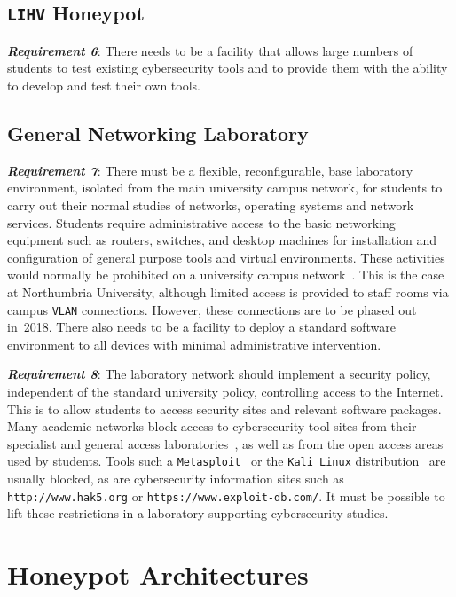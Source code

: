 \documentclass{ieeeaccess}
\begin{document}
\subsection{\texttt{LIHV} Honeypot}\label{subsec:LabHoneypot}

\noindent\textit{\textbf{Requirement 6}}:
There needs to be a facility that allows large numbers of students to test
existing cybersecurity tools and to provide them with the ability to develop
and test their own tools.

\subsection{General Networking Laboratory}\label{subsec:GeneralLab}

\noindent\textit{\textbf{Requirement 7}}: There must be a flexible,
reconfigurable, base laboratory environment, isolated from the main university
campus network, for students to carry out their normal studies of networks,
operating systems and network services. Students require administrative access
to the basic networking equipment such as routers, switches, and desktop
machines for installation and configuration of general purpose tools and
virtual environments. These activities would normally be prohibited on a
university campus network~\cite{MGDL:13}. This is the case at Northumbria
University, although limited access is provided to staff rooms via campus
\texttt{VLAN} connections. However, these connections are to be phased out 
in~2018. There also needs to be a facility to deploy a standard software
environment to all devices with minimal administrative intervention.  

\noindent\textit{\textbf{Requirement 8}}: The laboratory network should
implement a security policy, independent of the standard university policy,
controlling access to the Internet. This is to allow students to access
security sites and relevant software packages. Many academic networks block
access to cybersecurity tool sites from their specialist and general access
laboratories~\cite{ACGO:06,YYLCHJ:04}, as well as from the open access areas
used by students. Tools such a \texttt{Metasploit}~\cite{R7:17} or the
\texttt{Kali Linux} distribution~\cite{OS:17} are usually blocked, as are
cybersecurity information sites such as \texttt{http://www.hak5.org} or
\texttt{https://www.exploit-db.com/}. It must be possible to lift these
restrictions in a laboratory supporting cybersecurity studies.

\section{Honeypot Architectures}\label{sec:HoneyArch}
\end{document}
